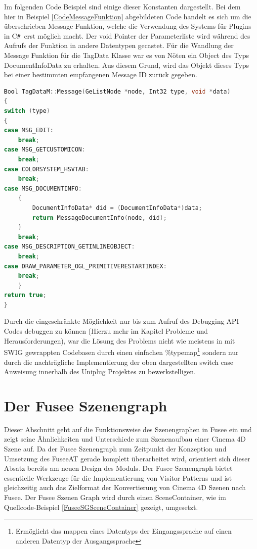 \documentclass[pagesize, paper=a4, fontsize=12pt, titlepage=true, headings=small, headnosepline, abstractoff, liststotoc, nochapterprefix, plainheadsepline, twoside]{scrreprt}
\newcommand{\CSS}{C\texttt{\# }}
\begin{document}
Im folgenden Code Beispiel sind einige dieser Konstanten dargestellt. Bei dem hier in Beispiel \ref{CodeMessageFunktion} abgebildeten Code handelt es sich um die überschrieben Message Funktion, welche die Verwendung des Systems für Plugins in \CSS erst möglich macht. Der void Pointer der Parameterliste wird während des Aufrufs der Funktion in andere Datentypen gecastet. Für die Wandlung der Message Funktion für die TagData Klasse war es von Nöten ein Object des Typs DocumentInfoData zu erhalten. Aus diesem Grund, wird das Objekt dieses Typs bei einer bestimmten empfangenen Message ID zurück gegeben.
\begin{lstlisting}[language=C++, caption = Überschreiben der Message Funktion des TagData Datentyps, label=CodeMessageFunktion]
Bool TagDataM::Message(GeListNode *node, Int32 type, void *data)
{
switch (type)
{
case MSG_EDIT:
	break;
case MSG_GETCUSTOMICON:
	break;
case COLORSYSTEM_HSVTAB:
	break;
case MSG_DOCUMENTINFO:
	{
		DocumentInfoData* did = (DocumentInfoData*)data;
		return MessageDocumentInfo(node, did);
	}
	break;
case MSG_DESCRIPTION_GETINLINEOBJECT:
	break;
case DRAW_PARAMETER_OGL_PRIMITIVERESTARTINDEX:
	break;
	}
return true;
}
\end{lstlisting}

Durch die eingeschränkte  Möglichkeit nur bis zum Aufruf des Debugging API Codes debuggen zu können (Hierzu mehr im Kapitel Probleme und Herausforderungen), war die Lösung des Problems nicht wie meistens in mit SWIG gewrappten Codebasen durch einen einfachen \%typemap\footnote{Ermöglicht das mappen eines Datentyps der Eingangssprache auf einen anderen Datentyp der Ausgangssprache} sondern nur durch die nachträgliche Implementierung der oben dargestellten switch case Anweisung innerhalb des Uniplug Projektes zu bewerkstelligen. 

\section{Der Fusee Szenengraph}
Dieser Abschnitt geht auf die Funktionsweise des Szenengraphen in Fusee ein und zeigt seine Ähnlichkeiten und Unterschiede zum Szenenaufbau einer Cinema 4D Szene auf. Da der Fusee Szenengraph zum Zeitpunkt der Konzeption und Umsetzung des FuseeAT gerade komplett überarbeitet wird, orientiert sich dieser Absatz bereits am neuen Design des Moduls. Der Fusee Szenengraph bietet essentielle Werkzeuge für die Implementierung von Visitor Patterns und ist gleichzeitig auch das Zielformat der Konvertierung von Cinema 4D Szenen nach Fusee. Der Fusee Szenen Graph wird durch einen SceneContainer, wie im Quellcode-Beispiel \ref{FuseeSGSceneContainer} gezeigt, umgesetzt.
\end{document}
